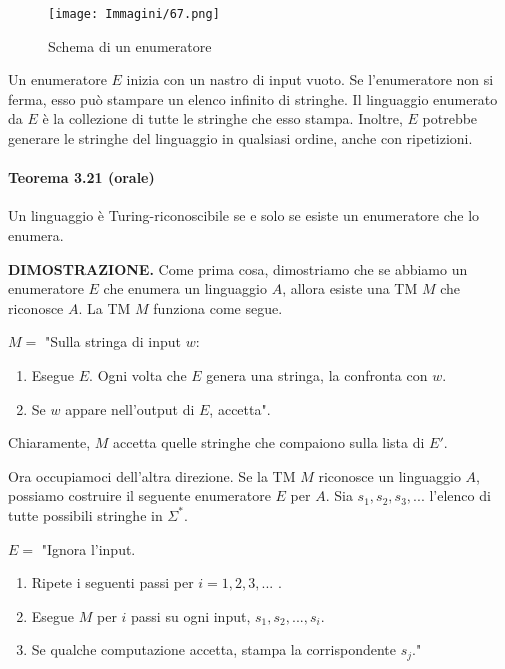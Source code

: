 \documentclass{article}
\begin{document}
\begin{figure}[H]
    \centering
    \texttt{[image: Immagini/67.png]}
    \caption{Schema di un enumeratore}
    \label{fig:enumerator_example}
\end{figure}

Un enumeratore $E$ inizia con un nastro di input vuoto. Se l'enumeratore non si ferma, esso può stampare un elenco infinito di stringhe.
Il linguaggio enumerato da $E$ è la collezione di tutte le stringhe che esso stampa.
Inoltre, $E$ potrebbe generare le stringhe del linguaggio in qualsiasi ordine, anche con ripetizioni.
\newpage
\paragraph{Teorema 3.21 (orale)}
\label{th:da MdT a enumerator}
\text{ }

\begin{tcolorbox}[colback=red!10!white, colframe=red!50!black, title=Teorema 3.21 orale]
    Un linguaggio è Turing-riconoscibile se e solo se esiste un enumeratore che lo enumera.
\end{tcolorbox}

\textbf{DIMOSTRAZIONE.}
Come prima cosa, dimostriamo che se abbiamo un enumeratore $E$ che enumera un linguaggio $A$, allora esiste una TM $M$ che riconosce $A$.
La TM $M$ funziona come segue.
\vspace{1em}

$M = $ "Sulla stringa di input $w$:
\begin{enumerate}
    \item Esegue $E$. Ogni volta che $E$ genera una stringa, la confronta con $w$.
    \item Se $w$ appare nell'output di $E$, accetta".
\end{enumerate}

Chiaramente, $M$ accetta quelle stringhe che compaiono sulla lista di $E'$.

Ora occupiamoci dell'altra direzione.
Se la TM $M$ riconosce un linguaggio $A$, possiamo costruire il seguente enumeratore $E$ per $A$.
Sia $s_1,s_2,s_3,...$ l'elenco di tutte possibili stringhe in $\Sigma^*$.
\vspace{1em}

$E = $ "Ignora l'input.
\begin{enumerate}
    \item Ripete i seguenti passi per $i = 1,2,3,...$ .
    \item Esegue $M$ per $i$ passi su ogni input, $s_1,s_2,...,s_i$.
    \item Se qualche computazione accetta, stampa la corrispondente $s_j$."
\end{enumerate}
\end{document}
